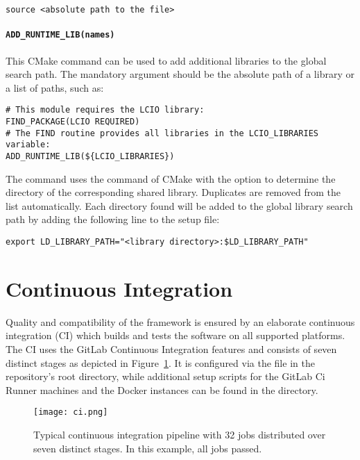 \begin{verbatim}
source <absolute path to the file>
\end{verbatim}

\paragraph{\texttt{\textbf{ADD\_RUNTIME\_LIB(names)}}}

This CMake command can be used to add additional libraries to the global search path.
The mandatory argument  should be the absolute path of a library or a list of paths, such as:

\begin{verbatim}
# This module requires the LCIO library:
FIND_PACKAGE(LCIO REQUIRED)
# The FIND routine provides all libraries in the LCIO_LIBRARIES variable:
ADD_RUNTIME_LIB(${LCIO_LIBRARIES})
\end{verbatim}

The command uses the  command of CMake with the  option to determine the directory of the corresponding shared library.
Duplicates are removed from the list automatically.
Each directory found will be added to the global library search path by adding the following line to the setup file:

\begin{verbatim}
export LD_LIBRARY_PATH="<library directory>:$LD_LIBRARY_PATH"
\end{verbatim}

\section{Continuous Integration}
\label{sec:ci}

Quality and compatibility of the \apsq framework is ensured by an elaborate continuous integration (CI) which builds and tests the software on all supported platforms.
The \apsq CI uses the GitLab Continuous Integration features and consists of seven distinct stages as depicted in Figure~\ref{fig:ci}.
It is configured via the  file in the repository's root directory, while additional setup scripts for the GitLab Ci Runner machines and the Docker instances can be found in the  directory.

\begin{figure}[btp]
  \centering
  \texttt{[image: ci.png]}
  \caption{Typical \apsq continuous integration pipeline with 32 jobs distributed over seven distinct stages. In this example, all jobs passed.}
  \label{fig:ci}
\end{figure}

